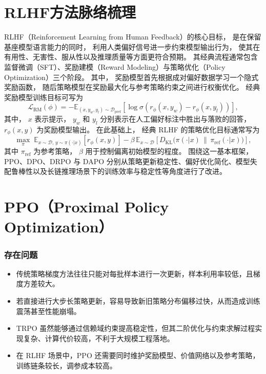 \documentclass[UTF8]{ctexart}
\begin{document}
\section{RLHF方法脉络梳理}

RLHF（Reinforcement Learning from Human Feedback）的核心目标，
是在保留基座模型语言能力的同时，
利用人类偏好信号进一步约束模型输出行为，
使其在有用性、无害性、服从性以及推理质量等方面更符合预期。
其经典流程通常包含监督微调（SFT）、奖励建模（Reward Modeling）与策略优化（Policy Optimization）三个阶段。
其中，
奖励模型首先根据成对偏好数据学习一个隐式奖励函数，
随后策略模型在奖励最大化与参考策略约束之间进行权衡优化。
经典奖励模型训练目标可写为
\begin{equation}
\mathcal{L}_{\mathrm{RM}}(\phi)
=
-
\mathbb{E}_{(x,y_w,y_l)\sim \mathcal{D}_{\mathrm{pref}}}
\left[
\log \sigma\!\left(r_\phi(x,y_w)-r_\phi(x,y_l)\right)
\right],
\end{equation}
其中，
$x$ 表示提示，
$y_w$ 和 $y_l$ 分别表示在人工偏好标注中胜出与落败的回答，
$r_\phi(x,y)$ 为奖励模型输出。
在此基础上，
经典 RLHF 的策略优化目标通常写为
\begin{equation}
\max_{\pi}
\;
\mathbb{E}_{x\sim \mathcal{D},\, y\sim \pi(\cdot|x)}
\left[
r_\phi(x,y)
\right]
-
\beta\,
\mathbb{E}_{x\sim \mathcal{D}}
\left[
D_{\mathrm{KL}}\!\bigl(\pi(\cdot|x)\,\|\,\pi_{\mathrm{ref}}(\cdot|x)\bigr)
\right],
\end{equation}
其中 $\pi_{\mathrm{ref}}$ 为参考策略，
$\beta$ 用于控制偏离初始模型的程度。
围绕这一基本框架，
PPO、DPO、DRPO 与 DAPO 分别从策略更新稳定性、偏好优化简化、模型失配鲁棒性以及长链推理场景下的训练效率与稳定性等角度进行了改进。

\section{PPO（Proximal Policy Optimization）}

\subsubsection{存在问题}

\begin{itemize}
    \item 传统策略梯度方法往往只能对每批样本进行一次更新，样本利用率较低，且梯度方差较大。
    \item 若直接进行大步长策略更新，容易导致新旧策略分布偏移过快，从而造成训练震荡甚至性能崩塌。
    \item TRPO 虽然能够通过信赖域约束提高稳定性，但其二阶优化与约束求解过程实现复杂、计算代价较高，不利于大规模工程落地。
    \item 在 RLHF 场景中，PPO 还需要同时维护奖励模型、价值网络以及参考策略，训练链条较长，调参成本较高。
\end{itemize}
\end{document}
